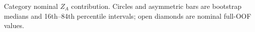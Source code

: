 Category nominal $Z_A$ contribution. Circles and asymmetric bars are bootstrap medians and 16th--84th percentile intervals; open diamonds are nominal full-OOF values.
